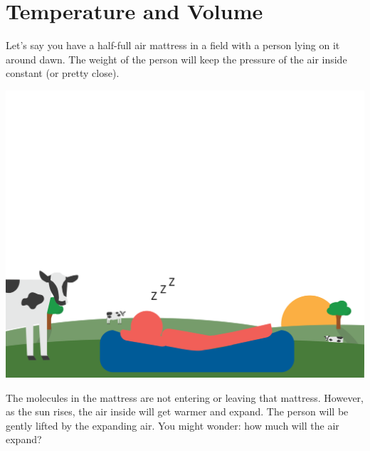 \section{Temperature and Volume}

Let's say you have a half-full air mattress in a field with a person lying on it around dawn.   The weight of the person will keep the pressure of the air inside constant (or pretty close).  

\includegraphics[width=\textwidth]{airMattress1.png}


The molecules in the mattress are not entering or leaving that mattress.  However, as the sun rises,  the air inside will get warmer and expand.  The person will be gently lifted by the expanding air.  You might wonder: how much will the air expand?

